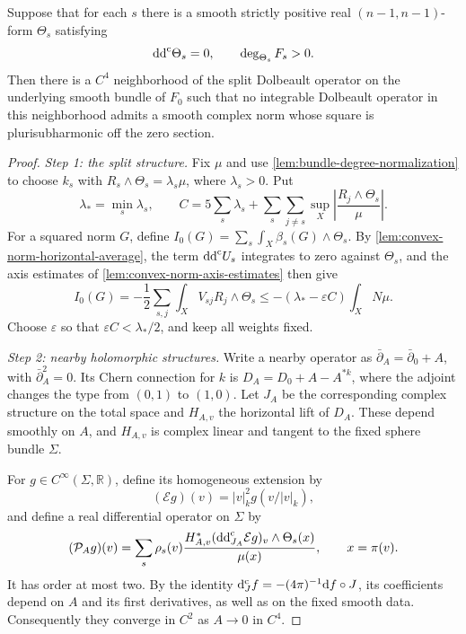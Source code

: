 \begin{theorem}\label{thm:convex-norm-deformation-obstruction}
Suppose that for each $s$ there is a smooth strictly positive real $(n-1,n-1)$-form $\Theta_s$ satisfying
\[
 \mathrm{dd}^{\mathrm{c}}\Theta_s=0,\qquad \deg_{\Theta_s}F_s>0.
\]
Then there is a $C^4$ neighborhood of the split Dolbeault operator on the underlying smooth bundle of $F_0$ such that no integrable Dolbeault operator in this neighborhood admits a smooth complex norm whose square is plurisubharmonic off the zero section.
\end{theorem}
\begin{proof}
\emph{Step 1: the split structure.} Fix $\mu$ and use \cref{lem:bundle-degree-normalization} to choose $k_s$ with
$R_s\wedge\Theta_s=\lambda_s\mu$, where $\lambda_s>0$. Put
\[
 \lambda_* =\min_s\lambda_s,\qquad
 C=5\sum_s\lambda_s+
   \sum_s\sum_{j\ne s}\sup_X\left|\frac{R_j\wedge\Theta_s}{\mu}\right|.
\]
For a squared norm $G$, define $I_0(G)=\sum_s\int_X\beta_s(G)\wedge\Theta_s$. By \cref{lem:convex-norm-horizontal-average}, the term $\mathrm{dd}^{\mathrm{c}} U_s$ integrates to zero against $\Theta_s$, and the axis estimates of \cref{lem:convex-norm-axis-estimates} then give
\[
 I_0(G)=-\frac12\sum_{s,j}\int_XV_{sj}R_j\wedge\Theta_s
 \leq-(\lambda_* -\varepsilon C)\int_XN\mu.
\]
Choose $\varepsilon$ so that $\varepsilon C<\lambda_*/2$, and keep all weights fixed.

\emph{Step 2: nearby holomorphic structures.} Write a nearby operator as $\bar\partial_A=\bar\partial_0+A$, with
$\bar\partial_A^2=0$. Its Chern connection for $k$ is $D_A=D_0+A-A^{*k}$, where the adjoint changes the type from $(0,1)$ to $(1,0)$. Let $J_A$ be the corresponding complex structure on the total space and $H_{A,v}$ the horizontal lift of $D_A$. These depend smoothly on $A$, and $H_{A,v}$ is complex linear and tangent to the fixed sphere bundle $\Sigma$.

For $g\in C^\infty(\Sigma,\mathbb R)$, define its homogeneous extension by
\[
 (\mathcal Eg)(v)=|v|_k^2g(v/|v|_k),
\]
and define a real differential operator on $\Sigma$ by
\[
 (\mathcal P_Ag)(v)=\sum_s\rho_s(v)
 \frac{H_{A,v}^*(\mathrm{dd}^{\mathrm{c}}_{J_A}\mathcal Eg)_v\wedge\Theta_s(x)}{\mu(x)},
 \qquad x=\pi(v).
\]
It has order at most two. By the identity
$\mathrm d^{\mathrm c}_Jf=-(4\pi)^{-1}\mathrm df\circ J$, its coefficients depend on $A$ and its first derivatives, as well as on the fixed smooth data. Consequently they converge in $C^2$ as $A\to0$ in $C^4$.


\end{proof}
